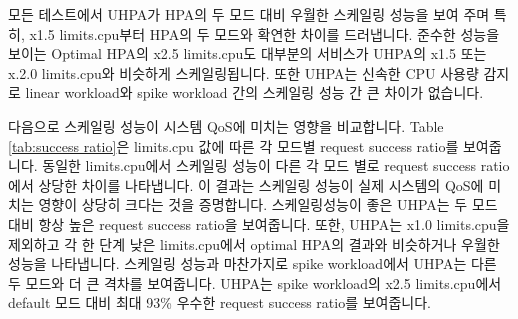 \documentclass[conference]{IEEEtran}
\begin{document}
모든 테스트에서 UHPA가 HPA의 두 모드 대비 우월한 스케일링 성능을 보여 주며 특히,  x1.5 limits.cpu부터 HPA의 두 모드와 확연한 차이를 드러냅니다. 준수한 성능을 보이는 Optimal HPA의 x2.5 limits.cpu도 대부분의 서비스가 UHPA의 x1.5 또는 x.2.0 limits.cpu와 비슷하게 스케일링됩니다. 또한 UHPA는 신속한 CPU 사용량 감지로 linear workload와 spike workload 간의 스케일링 성능 간 큰 차이가 없습니다.

다음으로 스케일링 성능이 시스템 QoS에 미치는 영향을 비교합니다. Table \ref{tab:success ratio}은 limits.cpu 값에 따른 각 모드별 request success ratio를 보여줍니다. 동일한 limits.cpu에서 스케일링 성능이 다른 각 모드 별로 request success ratio에서 상당한 차이를 나타냅니다. 이 결과는 스케일링 성능이 실제 시스템의 QoS에 미치는 영향이 상당히 크다는 것을 증명합니다. 스케일링성능이 좋은 UHPA는 두 모드 대비 항상 높은 request success ratio을 보여줍니다. 또한, UHPA는 x1.0 limits.cpu을 제외하고 각 한 단계 낮은 limits.cpu에서 optimal HPA의 결과와 비슷하거나 우월한 성능을 나타냅니다.  스케일링 성능과 마찬가지로 spike workload에서 UHPA는 다른 두 모드와 더 큰 격차를 보여줍니다. UHPA는 spike workload의 x2.5 limits.cpu에서 default 모드 대비 최대 93\% 우수한 request success ratio를 보여줍니다.
\end{document}
